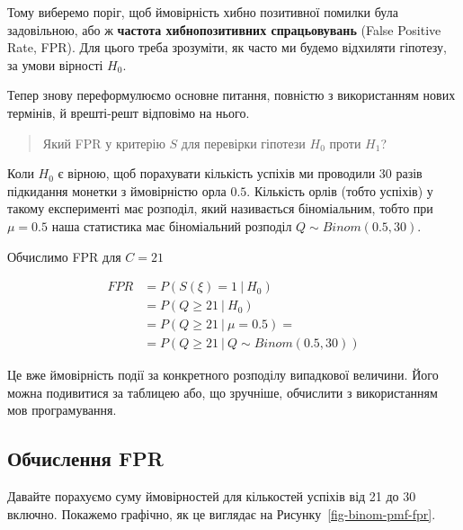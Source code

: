 \documentclass[
  letterpaper,
  10pt,
  openany]{report}
\theoremstyle{definition}
\theoremstyle{remark}
\begin{document}
Тому виберемо поріг, щоб ймовірність хибно позитивної помилки була
задовільною, або ж \textbf{частота хибнопозитивних спрацьовувань} (False
Positive Rate, FPR). Для цього треба зрозуміти, як часто ми будемо
відхиляти гіпотезу, за умови вірності \(H_0\).

Тепер знову переформулюємо основне питання, повністю з використанням
нових термінів, й врешті-решт відповімо на нього.

\begin{quote}
Який FPR у критерію \(S\) для перевірки гіпотези \(H_0\) проти \(H_1\)?
\end{quote}

Коли \(H_0\) є вірною, щоб порахувати кількість успіхів ми проводили 30
разів підкидання монетки з ймовірністю орла \(0.5\). Кількість орлів
(тобто успіхів) у такому експерименті має розподіл, який називається
біноміальним, тобто при \(\mu = 0.5\) наша статистика має біноміальний
розподіл \(Q \sim Binom(0.5, 30)\).

Обчислимо FPR для \(C = 21\)

\[
\begin{aligned}
FPR &= P(S(\xi) = 1\ |\ H_0) \\
&= P(Q \geqslant 21\ |\ H_0) \\
&= P(Q \geqslant 21\ |\ \mu = 0.5) = \\
&= P(Q \geqslant 21\ |\ Q \sim Binom(0.5, 30))
\end{aligned}
\]

Це вже ймовірність події за конкретного розподілу випадкової величини.
Його можна подивитися за таблицею або, що зручніше, обчислити з
використанням мов програмування.

\subsection{Обчислення
FPR}\label{ux43eux431ux447ux438ux441ux43bux435ux43dux43dux44f-fpr}

Давайте порахуємо суму ймовірностей для кількостей успіхів від 21 до 30
включно. Покажемо графічно, як це виглядає на
Рисунку~\ref{fig-binom-pmf-fpr}.
\end{document}
